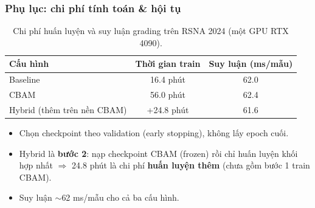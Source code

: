 \documentclass{beamer}
\numberwithin{figure}{section}
\numberwithin{table}{section}
\begin{document}
\begin{frame}
\frametitle{Phụ lục: chi phí tính toán \& hội tụ}
\begin{table}
\centering
\begin{tabular}{lcc}
\toprule
\textbf{Cấu hình} & \textbf{Thời gian train} & \textbf{Suy luận (ms/mẫu)} \\
\midrule
Baseline   & 16.4 phút & 62.0 \\
CBAM       & 56.0 phút & 62.4 \\
Hybrid (thêm trên nền CBAM) & +24.8 phút & 61.6 \\
\bottomrule
\end{tabular}
\caption{Chi phí huấn luyện và suy luận grading trên RSNA 2024 (một GPU RTX 4090).}
\end{table}
\begin{itemize}\footnotesize
    \item[--] Chọn checkpoint theo validation (early stopping), không lấy epoch cuối.
    \item[--] Hybrid là \textbf{bước 2}: nạp checkpoint CBAM (frozen) rồi chỉ huấn luyện khối hợp nhất $\Rightarrow$ 24.8 phút là chi phí \textbf{huấn luyện thêm} (chưa gồm bước 1 train CBAM).
    \item[--] Suy luận $\sim$62 ms/mẫu cho cả ba cấu hình.
\end{itemize}
\end{frame}
\end{document}
